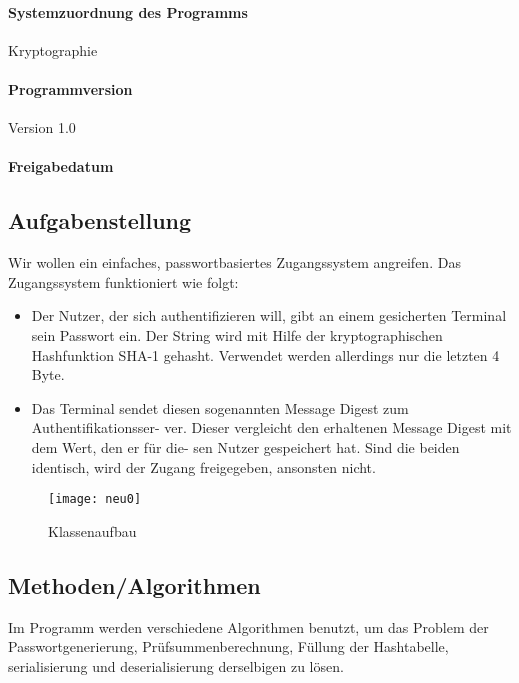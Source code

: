 \documentclass[11pt]{article}
\begin{document}
  \paragraph{Systemzuordnung des Programms}
  Kryptographie
  \paragraph{Programmversion}
  Version 1.0
  \paragraph{Freigabedatum}
  \date{26.11.2013}
  \newline
  \newline
 \subsection{Aufgabenstellung}
  Wir wollen ein einfaches, passwortbasiertes Zugangssystem angreifen. Das Zugangssystem
funktioniert wie folgt:
\begin{itemize} 
\item Der Nutzer, der sich authentifizieren will, gibt an einem gesicherten Terminal sein
Passwort ein. Der String wird mit Hilfe der kryptographischen Hashfunktion SHA-1
gehasht. Verwendet werden allerdings nur die letzten 4 Byte.
\item Das Terminal sendet diesen sogenannten Message Digest zum Authentifikationsser-
ver. Dieser vergleicht den erhaltenen Message Digest mit dem Wert, den er für die-
sen Nutzer gespeichert hat. Sind die beiden identisch, wird der Zugang freigegeben,
ansonsten nicht. 
\end{itemize}
 
  \begin{figure}
  \texttt{[image: neu0]} 
  \caption{Klassenaufbau} 
  \end{figure} 
  \subsection{Methoden/Algorithmen}
  Im Programm werden verschiedene Algorithmen benutzt, um das Problem der Passwortgenerierung, Prüfsummenberechnung, Füllung der Hashtabelle, serialisierung und deserialisierung derselbigen zu lösen.
  \newline
\end{document}
